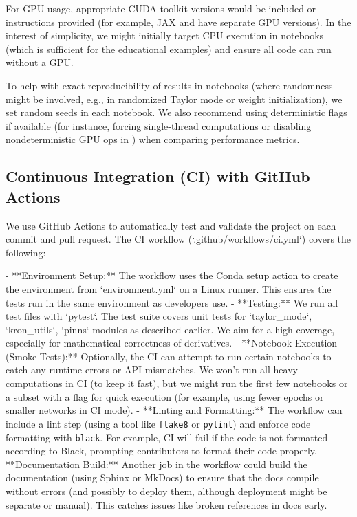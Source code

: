 \documentclass[11pt]{article}
\begin{document}
For GPU usage, appropriate CUDA toolkit versions would be included or instructions provided (for example, JAX and  have separate GPU versions). In the interest of simplicity, we might initially target CPU execution in notebooks (which is sufficient for the educational examples) and ensure all code can run without a GPU.

To help with exact reproducibility of results in notebooks (where randomness might be involved, e.g., in randomized Taylor mode or weight initialization), we set random seeds in each notebook. We also recommend using deterministic flags if available (for instance, forcing single-thread computations or disabling nondeterministic GPU ops in ) when comparing performance metrics.

\subsection{Continuous Integration (CI) with GitHub Actions}

We use GitHub Actions to automatically test and validate the project on each commit and pull request. The CI workflow (`.github/workflows/ci.yml`) covers the following:

- **Environment Setup:** The workflow uses the Conda setup action to create the environment from `environment.yml` on a Linux runner. This ensures the tests run in the same environment as developers use.
- **Testing:** We run all test files with `pytest`. The test suite covers unit tests for `taylor_mode`, `kron_utils`, `pinns` modules as described earlier. We aim for a high coverage, especially for mathematical correctness of derivatives.
- **Notebook Execution (Smoke Tests):** Optionally, the CI can attempt to run certain notebooks to catch any runtime errors or API mismatches. We won't run all heavy computations in CI (to keep it fast), but we might run the first few notebooks or a subset with a flag for quick execution (for example, using fewer epochs or smaller networks in CI mode).
- **Linting and Formatting:** The workflow can include a lint step (using a tool like \texttt{flake8} or \texttt{pylint}) and enforce code formatting with \texttt{black}. For example, CI will fail if the code is not formatted according to Black, prompting contributors to format their code properly.
- **Documentation Build:** Another job in the workflow could build the documentation (using Sphinx or MkDocs) to ensure that the docs compile without errors (and possibly to deploy them, although deployment might be separate or manual). This catches issues like broken references in docs early.
\end{document}
